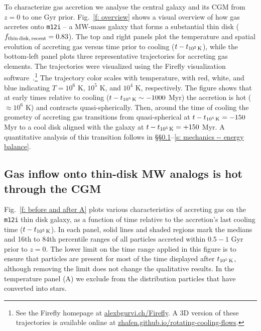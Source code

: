 \documentclass[fleqn,usenatbib]{mnras}
\newcommand{\fthin}{f_{\rm thin\,disk,\,recent}}
\newcommand{\tcools}{t_{10^5\,{\rm K}}}
\begin{document}
To characterize gas accretion we analyse the central galaxy and its CGM from $z=0$ to one Gyr prior.
Fig.~\ref{f: overview} shows a visual overview of how gas accretes onto \texttt{m12i} -- a MW-mass galaxy that forms a substantial thin disk ($\fthin = 0.83$). 
The top and right panels plot the temperature and spatial evolution of accreting gas versus time prior to cooling ($t-\tcools$), while the bottom-left panel plots three representative trajectories for accreting gas elements.
The trajectories were visualized using the Firefly visualization software~\citep{Geller2018}.\footnote{See the Firefly homepage at \url{alexbgurvi.ch/Firefly}.
A 3D version of these trajectories is available online at \url{zhafen.github.io/rotating-cooling-flows}.}
The trajectory color scales with temperature, with red, white, and blue indicating $T=10^6$ K, $10^5$ K, and $10^4$ K, respectively.
The figure shows that at early times relative to cooling ($t-\tcools \sim -1000$ Myr) the accretion is hot ($\approx10^6$ K) and contracts quasi-spherically.
Then, around the time of cooling the geometry of accreting gas transitions from quasi-spherical at $t - \tcools=-150$ Myr to a cool disk aligned with the galaxy at $t - \tcools=+ 150$ Myr.
A quantitative analysis of this transition follows in \S\S\ref{s: characteristics -- inflowing gas phase}--\ref{s: mechanics -- energy balance}.

\subsection{Gas inflow onto thin-disk MW analogs is hot through the CGM}
\label{s: characteristics -- inflowing gas phase}

Fig.~\ref{f: before and after A} plots various characteristics of accreting gas on the \texttt{m12i} thin disk galaxy, as a function of time relative to the accretion's last cooling time ($t - \tcools$).
In each panel, solid lines and shaded regions mark the medians and 16th to 84th percentile ranges of all particles accreted within $0.5-1$ Gyr prior to $z=0$.
The lower limit on the time range applied in this figure is to ensure that particles are present for most of the time displayed after $\tcools$, although removing the limit does not change the qualitative results.
In the temperature panel (A) we exclude from the distribution particles that have converted into stars. 
\end{document}
